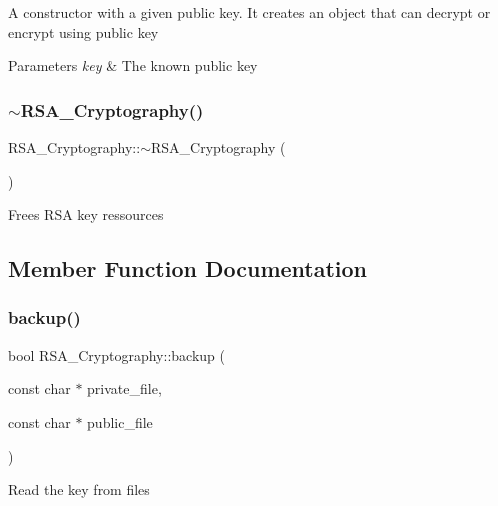 A constructor with a given public key. It creates an object that can decrypt or encrypt using public key


\begin{DoxyParams}{Parameters}
{\em key} & The known public key \\
\hline
\end{DoxyParams}
\mbox{\label{classRSA__Cryptography_ae8a837cfb0a55afd707af939261acc52}} 
\subsubsection{\texorpdfstring{$\sim$\+R\+S\+A\+\_\+\+Cryptography()}{~RSA\_Cryptography()}}
{\footnotesize\ttfamily R\+S\+A\+\_\+\+Cryptography\+::$\sim$\+R\+S\+A\+\_\+\+Cryptography (\begin{DoxyParamCaption}{ }\end{DoxyParamCaption})\hspace{0.3cm}{\ttfamily [virtual]}}

Frees R\+SA key ressources 

\subsection{Member Function Documentation}
\mbox{\label{classRSA__Cryptography_ae3ccf77d8754acdfb444dbab6fb6a4dd}} 
\subsubsection{\texorpdfstring{backup()}{backup()}}
{\footnotesize\ttfamily bool R\+S\+A\+\_\+\+Cryptography\+::backup (\begin{DoxyParamCaption}\item[{const char $\ast$}]{private\+\_\+file,  }\item[{const char $\ast$}]{public\+\_\+file }\end{DoxyParamCaption})}

Read the key from files



